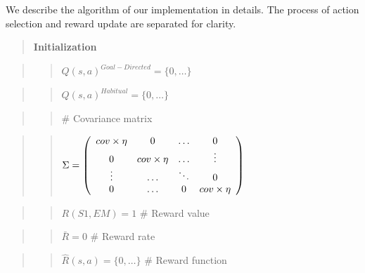 \documentclass[10pt,a4paper,onecolumn]{article}
\begin{document}
We describe the algorithm of our implementation in details. The process
of action selection and reward update are separated for clarity.

\begin{quote}
\textbf{Initialization}
\end{quote}

\begin{quote}
\begin{quote}
\(Q(s, a)^{Goal-Directed} = \{ 0, \ldots \}\)
\end{quote}
\end{quote}

\begin{quote}
\begin{quote}
\(Q(s, a)^{Habitual} = \{ 0, \dots \}\)
\end{quote}
\end{quote}

\begin{quote}
\begin{quote}
\(\#\) Covariance matrix
\end{quote}
\end{quote}

\begin{quote}
\begin{quote}
\(\Sigma = \left(  \begin{array}{*4{c}}  cov \times \eta & 0 & \ldots & 0 \\  0 & cov \times \eta & \ldots & \vdots \\  \vdots & \ldots & \ddots & 0 \\  0 & \ldots & 0 & cov \times \eta \\  \end{array}\right)\)
\end{quote}
\end{quote}

\begin{quote}
\begin{quote}
\(R(S1, EM) = 1\) \(\#\) Reward value
\end{quote}
\end{quote}

\begin{quote}
\begin{quote}
\(\bar{R} = 0\) \(\#\) Reward rate
\end{quote}
\end{quote}

\begin{quote}
\begin{quote}
\(\hat{R}(s,a) = \{0,\ldots\}\) \(\#\) Reward function
\end{quote}
\end{quote}
\end{document}
